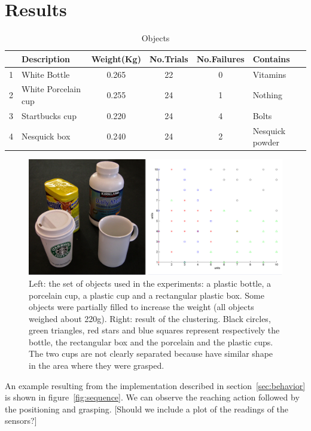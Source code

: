 \section{Results}
\label{sec-results}

\begin{table}[tb]
  \caption{Objects} \label{tab:objects} \centering
  \begin{tabular}{|c|l|c|c|c|l|}
    \hline
    &Description& Weight(Kg)&No.Trials&No.Failures&Contains \\
    \hline
    1&White Bottle        & 0.265 & 22& 0 & Vitamins\\
    2&White Porcelain cup & 0.255 & 24& 1 & Nothing\\
    3&Startbucks cup      & 0.220 & 24& 4 & Bolts \\
    4&Nesquick box        & 0.240 & 24& 2 & Nesquick powder\\

    \hline
  \end{tabular}
\end{table}

\begin{figure}[tb]
\centerline{
\includegraphics[width=6.0in]{./figures/objects-clusters.eps}
}\caption{Left: the set of objects used in the experiments: a plastic bottle, 
a porcelain cup, a plastic cup and a rectangular plastic box. Some objects were 
partially filled to increase the weight (all objects weighed about 220g). 
Right: result of the clustering. Black circles, green 
triangles, red stars and blue squares represent respectively the bottle, 
the rectangular box and the porcelain and the plastic cups. The two cups are not 
clearly separated because have similar shape in the area where they were grasped.}
\label{fig:Objects}
\end{figure}

An example resulting from the implementation described in
section~\ref{sec:behavior} is shown in figure~\ref{fig:sequence}.
We can observe the reaching action followed by the positioning and
grasping. [Should we include a plot of the readings of the
sensors?]

